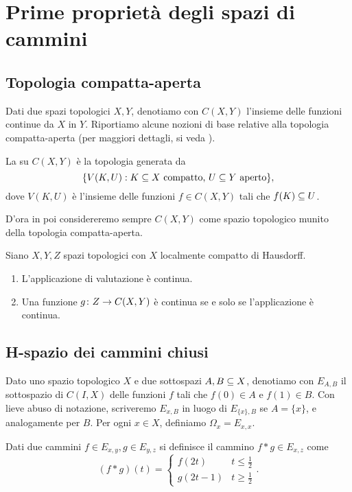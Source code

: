 \section{Prime proprietà degli spazi di cammini}
\subsection{Topologia compatta-aperta}
Dati due spazi topologici \(X,Y\), denotiamo con \(C(X,Y)\) l'insieme delle funzioni continue da \(X\) in \(Y\). Riportiamo alcune nozioni di base relative alla topologia compatta-aperta (per maggiori dettagli, si veda ).
\begin{definition}
La  su \(C(X,Y)\) è la topologia generata da 
\[
\{V(K,U):\text{\(K\subseteq X\) compatto, \(U\subseteq Y\) aperto}\},
\]
dove \(V(K,U)\) è l'insieme delle funzioni \(f\in C(X,Y)\) tali che \(f(K)\subseteq U\).
\end{definition}
D'ora in poi considereremo sempre \(C(X,Y)\) come spazio topologico munito della topologia compatta-aperta.
\begin{proposition}
Siano \(X,Y,Z\) spazi topologici con \(X\) localmente compatto di Hausdorff.
\begin{enumerate}
\item L'applicazione di valutazione
è continua.
\item Una funzione \(\map{g}{Z}{C(X,Y)}\) è continua se e solo se l'applicazione
è continua.
\end{enumerate}
\end{proposition}

\subsection{H-spazio dei cammini chiusi}

Dato uno spazio topologico \(X\) e due sottospazi \(A,B\subseteq X\), denotiamo con \(E_{A,B}\) il sottospazio di \(C(I,X)\) delle funzioni \(f\) tali che \(f(0)\in A\) e \(f(1)\in B\). Con lieve abuso di notazione, scriveremo \(E_{x,B}\) in luogo di \(E_{\{x\},B}\) se \(A=\{x\}\), e analogamente per \(B\). Per ogni \(x\in X\), definiamo \(\Omega_x=E_{x,x}\).

Dati due cammini \(f\in E_{x,y},g\in E_{y,z}\) si definisce il cammino \(f\ast g\in E_{x,z}\) come
\[
(f\ast g)(t)=
\begin{cases}
f(2t)&t\le\frac{1}{2}\\
g(2t-1)&t\ge\frac{1}{2}
\end{cases}.
\]


